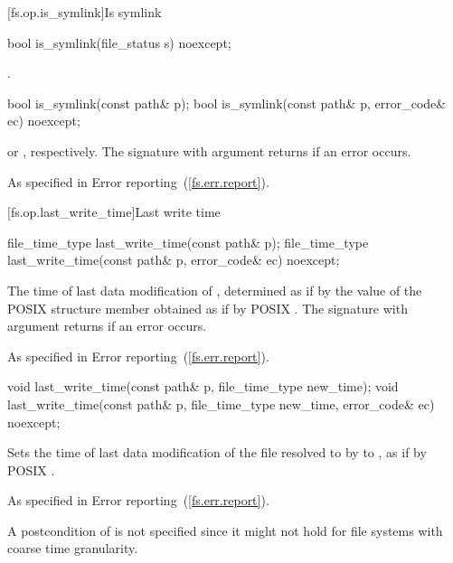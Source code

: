 [fs.op.is_symlink]{Is symlink}

%
\begin{itemdecl}
bool is_symlink(file_status s) noexcept;
\end{itemdecl}

\begin{itemdescr}
\pnum
\returns {}.
\end{itemdescr}

%
\begin{itemdecl}
bool is_symlink(const path& p);
bool is_symlink(const path& p, error_code& ec) noexcept;
\end{itemdecl}

\begin{itemdescr}
\pnum
\returns {} or ,
  respectively. The signature with argument  returns 
  if an error occurs.

\pnum
\throws As specified in Error reporting~(\ref{fs.err.report}).
\end{itemdescr}


[fs.op.last_write_time]{Last write time}

%
\begin{itemdecl}
file_time_type last_write_time(const path& p);
file_time_type last_write_time(const path& p, error_code& ec) noexcept;
\end{itemdecl}

\begin{itemdescr}
\pnum
\returns The time of last data modification of ,
  determined as if by the value of the POSIX  structure member 
  obtained as if by POSIX .
  The signature with argument  returns 
  if an error occurs.

\pnum
\throws As specified in Error reporting~(\ref{fs.err.report}).
\end{itemdescr}

%
\begin{itemdecl}
void last_write_time(const path& p, file_time_type new_time);
void last_write_time(const path& p, file_time_type new_time,
                     error_code& ec) noexcept;
\end{itemdecl}

\begin{itemdescr}
\pnum
\effects Sets the time of last data modification of the file
  resolved to by  to , as if by POSIX .

\pnum
\throws As specified in Error reporting~(\ref{fs.err.report}).

\pnum
\begin{note} A postcondition of  is not specified since it might not hold for file systems
  with coarse time granularity. \end{note}
\end{itemdescr}

